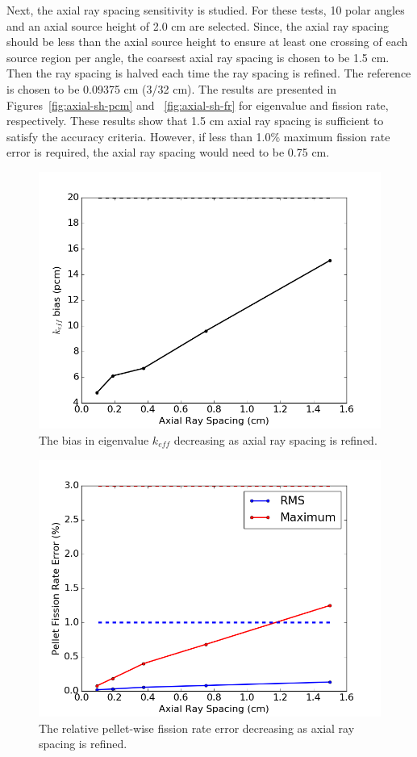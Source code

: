 Next, the axial ray spacing sensitivity is studied. For these tests, 10 polar angles and an axial source height of 2.0 cm are selected. Since, the axial ray spacing should be less than the axial source height to ensure at least one crossing of each source region per angle, the coarsest axial ray spacing is chosen to be 1.5 cm. Then the ray spacing is halved each time the ray spacing is refined. The reference is chosen to be 0.09375 cm (3/32 cm). The results are presented in Figures~\ref{fig:axial-sh-pcm} and ~\ref{fig:axial-sh-fr} for eigenvalue and fission rate, respectively. These results show that 1.5 cm axial ray spacing is sufficient to satisfy the accuracy criteria. However, if less than 1.0\% maximum fission rate error is required, the axial ray spacing would need to be 0.75 cm.

\begin{figure}[h!]
	\centering
	\includegraphics[width=0.7\linewidth]{figures/results/sensitivity/z_spacing_pcm.png}
	\caption[]{The bias in eigenvalue $k_{\textit{eff}}$ decreasing as axial ray spacing is refined.}
	\label{fig:axial-rs-pcm}
\end{figure}
\begin{figure}[h!]
	\centering
	\includegraphics[width=0.7\linewidth]{figures/results/sensitivity/z_spacing_fr.png}
	\caption[]{The relative pellet-wise fission rate error decreasing as axial ray spacing is refined.}
	\label{fig:axial-rs-fr}
\end{figure}

